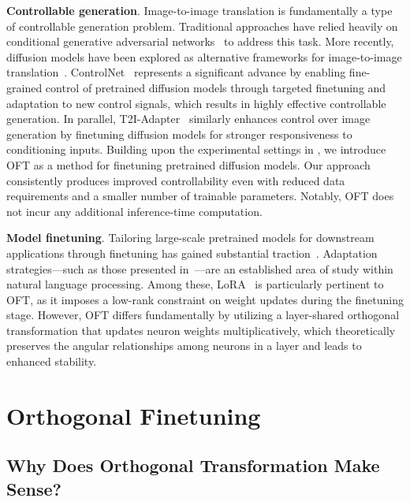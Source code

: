 \textbf{Controllable generation}. Image-to-image translation is fundamentally a type of controllable generation problem. Traditional approaches have relied heavily on conditional generative adversarial networks~\cite{isola2017image,zhu2017toward,wang2018high,park2019semantic,choi2018stargan} to address this task. More recently, diffusion models have been explored as alternative frameworks for image-to-image translation~\cite{saharia2022palette,voynov2022sketch,wang2022pretraining}. ControlNet~\cite{zhang2023adding} represents a significant advance by enabling fine-grained control of pretrained diffusion models through targeted finetuning and adaptation to new control signals, which results in highly effective controllable generation. In parallel, T2I-Adapter~\cite{mou2023t2i} similarly enhances control over image generation by finetuning diffusion models for stronger responsiveness to conditioning inputs. Building upon the experimental settings in \cite{zhang2023adding,mou2023t2i}, we introduce OFT as a method for finetuning pretrained diffusion models. Our approach consistently produces improved controllability even with reduced data requirements and a smaller number of trainable parameters. Notably, OFT does not incur any additional inference-time computation.

\textbf{Model finetuning}. Tailoring large-scale pretrained models for downstream applications through finetuning has gained substantial traction~\cite{devlin2018bert,brown2020language,he2022masked}. Adaptation strategies—such as those presented in~\cite{hulora2022,houlsby2019parameter,pfeiffer2020adapterfusion}—are an established area of study within natural language processing. Among these, LoRA~\cite{hulora2022} is particularly pertinent to OFT, as it imposes a low-rank constraint on weight updates during the finetuning stage. However, OFT differs fundamentally by utilizing a layer-shared orthogonal transformation that updates neuron weights multiplicatively, which theoretically preserves the angular relationships among neurons in a layer and leads to enhanced stability.

\section{Orthogonal Finetuning}

\subsection{Why Does Orthogonal Transformation Make Sense?}

